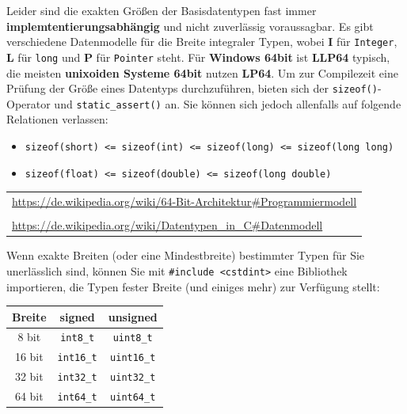 \documentclass[a4paper]{report}
\begin{document}
Leider sind die exakten Größen der Basisdatentypen fast immer \textbf{implemtentierungsabhängig} und nicht zuverlässig voraussagbar. Es gibt verschiedene Datenmodelle für die Breite integraler Typen, wobei \textbf{I} für \texttt{Integer}, \textbf{L} für \texttt{long} und \textbf{P} für \texttt{Pointer} steht. Für \textbf{Windows 64bit} ist \textbf{LLP64} typisch, die meisten \textbf{unixoiden Systeme 64bit} nutzen \textbf{LP64}. Um zur Compilezeit eine Prüfung der Größe eines Datentyps durchzuführen, bieten sich der \texttt{sizeof()}-Operator und \texttt{static\_assert()} an. Sie können sich jedoch allenfalls auf folgende Relationen verlassen:

\begin{itemize}
	\item \texttt{sizeof(short) \quad <= \quad sizeof(int) \quad <= \quad sizeof(long) \quad <= \quad sizeof(long long)}
	\item \texttt{sizeof(float) \quad <= \quad sizeof(double) \quad <= \quad sizeof(long double)}
\end{itemize}

\begin{center}
\begin{tabular}{l}
	\url{https://de.wikipedia.org/wiki/64-Bit-Architektur#Programmiermodell} \\ \\
	\url{https://de.wikipedia.org/wiki/Datentypen_in_C#Datenmodell}
\end{tabular}
\end{center}

\begin{multicols}{2}
Wenn exakte Breiten (oder eine Mindestbreite) bestimmter Typen für Sie unerlässlich sind, können Sie mit \texttt{\#include <cstdint>} eine Bibliothek importieren, die Typen fester Breite (und einiges mehr) zur Verfügung stellt:

\begin{center}
\begin{tabular}{|c||cc|}
	\hline
	\textbf{Breite} & \textbf{signed} & \textbf{unsigned} \\ \hline
	8 bit & \texttt{int8\_t} & \texttt{uint8\_t} \\
	16 bit & \texttt{int16\_t} & \texttt{uint16\_t} \\
	32 bit & \texttt{int32\_t} & \texttt{uint32\_t} \\
	64 bit & \texttt{int64\_t} & \texttt{uint64\_t} \\
	\hline
	
\end{tabular}
\end{center}
\end{multicols}
\end{document}
